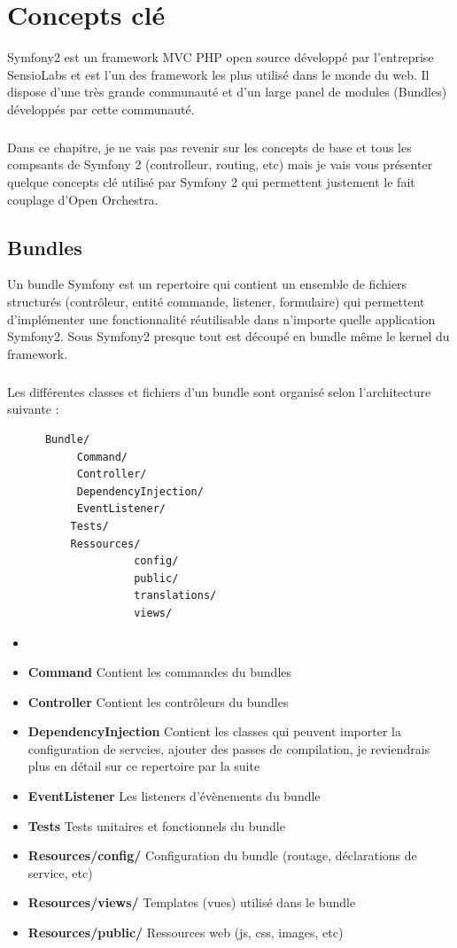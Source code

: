 \chapter{Concepts clé}
Symfony2 est un framework MVC PHP open source développé par l'entreprise SensioLabs et est l'un des framework les plus utilisé dans le monde du web. Il dispose d'une très grande communauté et d'un large panel de modules (\og{}Bundles\fg{}) développés par cette communauté.
\paragraph{}
Dans ce chapitre, je ne vais pas revenir sur les concepts de base et tous les compsants de Symfony 2 (controlleur, routing, etc) mais je vais vous présenter quelque concepts clé utilisé par Symfony 2 qui permettent justement le fait couplage d'Open Orchestra.
\section{Bundles}
Un bundle Symfony est un repertoire qui contient un ensemble de fichiers structurés (contrôleur, entité commande, listener, formulaire) qui permettent d'implémenter une fonctionnalité réutilisable dans n'importe quelle application Symfony2. Sous Symfony2 presque tout est découpé en bundle même le kernel du framework.
\paragraph{}
Les différentes classes et fichiers d'un bundle sont organisé selon l'architecture suivante : 

\begin{verbatim}
      Bundle/
           Command/  
           Controller/
           DependencyInjection/
           EventListener/
          Tests/
          Ressources/
                    config/
                    public/
                    translations/
                    views/
\end{verbatim}
\begin{itemize}
\item[]
\item \textbf{Command} Contient les commandes du bundles
\item \textbf{Controller} Contient les contrôleurs du bundles
\item \textbf{DependencyInjection} Contient les classes qui peuvent importer la configuration de servcies, ajouter des passes de compilation, je reviendrais plus en détail sur ce repertoire par la suite
\item \textbf{EventListener} Les listeners d'évènements du bundle
\item \textbf{Tests} Tests unitaires et fonctionnels du bundle
\item \textbf{Resources/config/} Configuration du bundle (routage, déclarations de service, etc)
\item \textbf{Resources/views/} Templates (vues) utilisé dans le bundle
\item \textbf{Resources/public/} Ressources web (js, css, images, etc)
\end{itemize}
